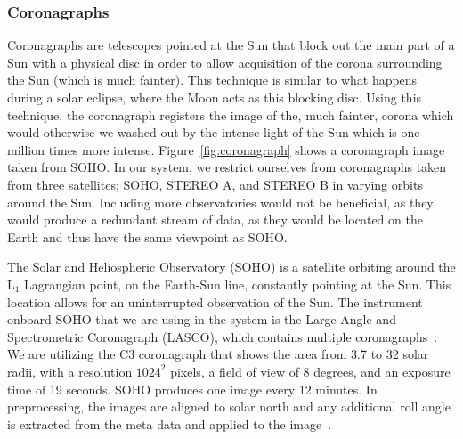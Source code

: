 \documentclass[journal]{vgtc}                %
\begin{document}
\subsubsection{Coronagraphs} \label{sec:coronagraph}
Coronagraphs are telescopes pointed at the Sun that block out the main part of a Sun with a physical disc in order to allow acquisition of the corona surrounding the Sun (which is much fainter). This technique is similar to what happens during a solar eclipse, where the Moon acts as this blocking disc. Using this technique, the coronagraph registers the image of the, much fainter, corona which would otherwise we washed out by the intense light of the Sun which is one million times more intense. Figure~\ref{fig:coronagraph} shows a coronagraph image taken from SOHO. In our system, we restrict ourselves from coronagraphs taken from three satellites; SOHO, STEREO A, and STEREO B in varying orbits around the Sun. Including more observatories would not be beneficial, as they would produce a redundant stream of data, as they would be located on the Earth and thus have the same viewpoint as SOHO.

 The Solar and Heliospheric Observatory (SOHO) is a satellite orbiting around the L$_1$ Lagrangian point, on the Earth-Sun line, constantly pointing at the Sun. This location allows for an uninterrupted observation of the Sun. The instrument onboard SOHO that we are using in the system is the Large Angle and Spectrometric Coronagraph (LASCO), which contains multiple coronagraphs~\cite{Brueckner:1995cb}. We are utilizing the C3 coronagraph that shows the area from 3.7 to 32 solar radii, with a resolution $1024^2$ pixels, a field of view of 8 degrees, and an exposure time of 19 seconds. SOHO produces one image every 12 minutes. In preprocessing, the images are aligned to solar north and any additional roll angle is extracted from the meta data and applied to the image~\cite{wells1981fits}.
\end{document}
